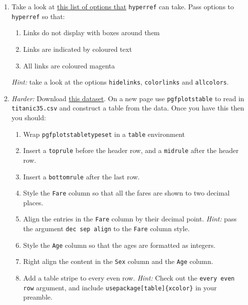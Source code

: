 \documentclass{article}
\begin{document}
\begin{enumerate}
  \item Take a look at
    \href{tftp://tug.ctan.org/pub/tex-archive/macros/latex/contrib/hyperref/doc/options.pdf}%
    {this list of options that} \texttt{hyperref} can take. Pass options to 
    \texttt{hyperref} so that:
    \begin{enumerate}
      \item Links do not display with boxes around them
      \item Links are indicated by coloured text
      \item All links are coloured magenta
    \end{enumerate}
    \textsl{Hint:} take a look at the options \texttt{hidelinks},
    \texttt{colorlinks} and \texttt{allcolors}.

  \item \emph{Harder:} Download
    \href{https://jwalton.info/assets/teaching/latex/titanic.csv}%
    {this dataset}. On a new page use \texttt{pgfplotstable} to read in 
    \texttt{titanic35.csv} and construct a table from the data. Once you have
    this then you should:
    \begin{enumerate}
      \item Wrap \texttt{pgfplotstabletypeset} in a \texttt{table} environment
      \item Insert a \texttt{toprule} before the header row, and a
        \texttt{midrule} after the header row.
      \item Insert a \texttt{bottomrule} after the last row.
      \item Style the \texttt{Fare} column so that all the fares are shown to
        two decimal places.
      \item Align the entries in the \texttt{Fare} column by their decimal
        point. \emph{Hint:} pass the argument \texttt{dec sep align} to the 
        \texttt{Fare} column style.
      \item Style the \texttt{Age} column so that the ages are formatted as
        integers.
      \item Right align the content in the \texttt{Sex} column and the
        \texttt{Age} column.
      \item Add a table stripe to every even row. \emph{Hint:} Check out the 
        \texttt{every even row} argument, and include 
        \texttt{\tb usepackage[table]\{xcolor\}} in your preamble.
    \end{enumerate}
\end{enumerate}
\end{document}
